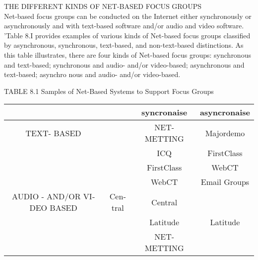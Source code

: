 \documentclass[a4 paper,12pt]{article}\usepackage{xepersian}
\begin{document}
\begin{latin}
\vspace{0.1cm}
\vspace{0.1cm}
THE DIFFERENT KINDS OF NET-BASED FOCUS GROUPS\\

\noindent
Net-based focus  groups  can  be conducted on the  Internet either synchronously or asynchronously and  with text-based software and/or audio and  video software.  'Table
8.I  provides examples  of  various kinds   of Net-based focus groups   classified   by asynchronous, synchronous, text-based, and  non-text-based distinctions. As this  table illustrates,  there are four kinds of Net-based focus groups: synchronous and text-based; synchronous and  audio- and/or video-based; asynchronous and  text-based; asynchro­ nous and  audio- and/or video-based. 
\vspace{0.1cm}


  

\vspace{0.1cm}

\vspace{0.1cm}


\vspace{0.1cm}

\vspace{0.1cm}

TABLE 8.1 Samples of Net-Based Systems to Support Focus  Groups\\
\begin{tabular}{cccc}\hline
                      &                             &syncronaise      & asyncronaise\\\hline
TEXT- BASED &                             & NET- METTING & Majordemo    \\\hline 
                      &                             &     ICQ              & FirstClass       \\\hline
                      &                             & FirstClass         & WebCT            \\\hline
                      &                             &   WebCT           & Email Groups    \\\hline 
AUDIO - AND/OR VIDEO BASED   &   Central           & Central             \\\hline
                      &                             &   Latitude          &   Latitude            \\\hline
                      &                             &  NET-METTING  &                            \\\hline




\end{tabular}
\end{latin}
\end{document}
